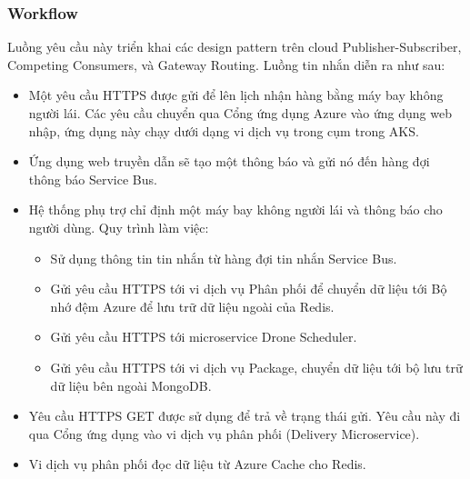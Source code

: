 \subsubsection{Workflow}
\noindent Luồng yêu cầu này triển khai các design pattern trên cloud Publisher-Subscriber, Competing Consumers, và Gateway Routing. Luồng tin nhắn diễn ra như sau:
    \begin{itemize}
        \item Một yêu cầu HTTPS được gửi để lên lịch nhận hàng bằng máy bay không người lái. Các yêu cầu chuyển qua Cổng ứng dụng Azure vào ứng dụng web nhập, ứng dụng này chạy dưới dạng vi dịch vụ trong cụm trong AKS.
        \item Ứng dụng web truyền dẫn sẽ tạo một thông báo và gửi nó đến hàng đợi thông báo Service Bus.
        \item Hệ thống phụ trợ chỉ định một máy bay không người lái và thông báo cho người dùng. Quy trình làm việc:
            \begin{itemize}
                \item Sử dụng thông tin tin nhắn từ hàng đợi tin nhắn Service Bus.
                \item Gửi yêu cầu HTTPS tới vi dịch vụ Phân phối để chuyển dữ liệu tới Bộ nhớ đệm Azure để lưu trữ dữ liệu ngoài của Redis.
                \item Gửi yêu cầu HTTPS tới microservice Drone Scheduler. 
                \item Gửi yêu cầu HTTPS tới vi dịch vụ Package, chuyển dữ liệu tới bộ lưu trữ dữ liệu bên ngoài MongoDB.
            \end{itemize} 
        \item Yêu cầu HTTPS GET được sử dụng để trả về trạng thái gửi. Yêu cầu này đi qua Cổng ứng dụng vào vi dịch vụ phân phối (Delivery Microservice).
        \item Vi dịch vụ phân phối đọc dữ liệu từ Azure Cache cho Redis.     
    \end{itemize}
